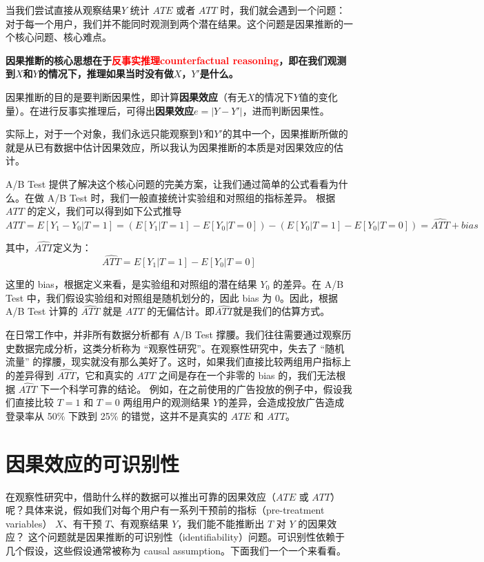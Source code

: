 \documentclass[12pt]{article}
\begin{document}
当我们尝试直接从观察结果$Y$  统计 $ATE$ 或者 $ATT$ 时，我们就会遇到一个问题：对于每一个用户，我们并不能同时观测到两个潜在结果。这个问题是因果推断的一个核心问题、核心难点。

\begin{mdframed}[
linecolor=black!40,outerlinewidth=1pt,roundcorner=.5em,innertopmargin=1ex,innerbottommargin=.5\baselineskip,innerrightmargin=1em,innerleftmargin=1em,backgroundcolor=gray!5,
]
\textbf{因果推断的核心思想在于\textcolor{red}{反事实推理counterfactual reasoning}，即在我们观测到$X$和$Y$的情况下，推理如果当时没有做$X$，$Y'$是什么。}
\end{mdframed}

因果推断的目的是要判断因果性，即计算\textbf{因果效应}（有无$X$的情况下$Y$值的变化量）。在进行反事实推理后，可得出\textbf{因果效应}$e = |Y - Y'|$，进而判断因果性。

实际上，对于一个对象，我们永远只能观察到$Y$和$Y'$的其中一个，因果推断所做的就是从已有数据中估计因果效应，所以我认为因果推断的本质是对因果效应的估计。

A/B Test 提供了解决这个核心问题的完美方案，让我们通过简单的公式看看为什么。在做 A/B Test 时，我们一般直接统计实验组和对照组的指标差异。
根据 $ATT$ 的定义，我们可以得到如下公式推导
$$
ATT = E[Y_1 - Y_0 | T=1] = (E[Y_1|T=1] - E[Y_0|T=0]) - (E[Y_0|T=1] - E[Y_0|T=0]) = \hat{ATT} + bias
$$

其中，$\hat{ATT}$定义为：
$$
\hat{ATT} = E[Y_1 | T = 1] - E[Y_0|T=0]
$$

这里的 bias，根据定义来看，是实验组和对照组的潜在结果 $Y_0$ 的差异。在 A/B Test 中，我们假设实验组和对照组是随机划分的，因此 bias 为 0。因此，根据 A/B Test 计算的 $\hat{ATT}$ 就是 $ATT$ 的无偏估计。即$\hat{ATT}$就是我们的估算方式。

在日常工作中，并非所有数据分析都有 A/B Test 撑腰。我们往往需要通过观察历史数据完成分析，这类分析称为 “观察性研究”。在观察性研究中，失去了 “随机流量” 的撑腰，现实就没有那么美好了。这时，如果我们直接比较两组用户指标上的差异得到 $\hat{ATT}$，它和真实的 $ATT$ 之间是存在一个非零的 bias 的，我们无法根据  $\hat{ATT}$ 下一个科学可靠的结论。 例如，在之前使用的广告投放的例子中，假设我们直接比较 $T=1$ 和 $T=0$ 两组用户的观测结果 $Y$的差异，会造成投放广告造成登录率从 50\% 下跌到 25\% 的错觉，这并不是真实的 $ATE$ 和 $ATT$。


\section{因果效应的可识别性}
在观察性研究中，借助什么样的数据可以推出可靠的因果效应（$ATE$ 或 $ATT$）呢？具体来说，假如我们对每个用户有一系列干预前的指标（pre-treatment variables） $X$、有干预 $T$、有观察结果 $Y$，我们能不能推断出 $T$ 对 $Y$ 的因果效应？
这个问题就是因果推断的可识别性（identifiability）问题。可识别性依赖于几个假设，这些假设通常被称为 causal assumption。下面我们一个一个来看看。
\end{document}

